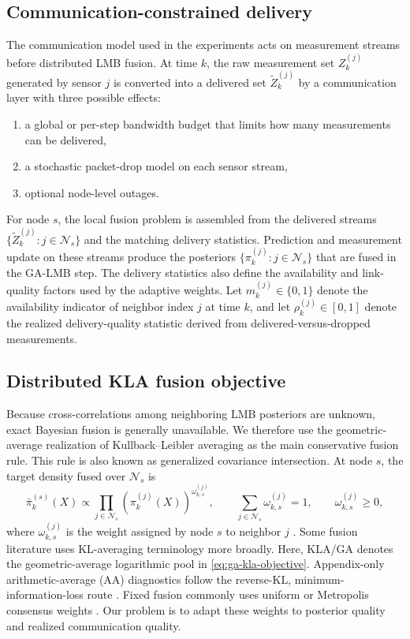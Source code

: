 \subsection{Communication-constrained delivery}

The communication model used in the experiments acts on measurement streams before distributed LMB fusion. At time $k$, the raw measurement set $Z_k^{(j)}$ generated by sensor $j$ is converted into a delivered set $\tilde{Z}_k^{(j)}$ by a communication layer with three possible effects:
\begin{enumerate}
\item a global or per-step bandwidth budget that limits how many measurements can be delivered,
\item a stochastic packet-drop model on each sensor stream,
\item optional node-level outages.
\end{enumerate}
For node $s$, the local fusion problem is assembled from the delivered streams $\{\tilde{Z}_k^{(j)}:j\in\mathcal{N}_s\}$ and the matching delivery statistics. Prediction and measurement update on these streams produce the posteriors $\{\pi_k^{(j)}:j\in\mathcal{N}_s\}$ that are fused in the GA-LMB step. The delivery statistics also define the availability and link-quality factors used by the adaptive weights. Let $m_k^{(j)} \in \{0,1\}$ denote the availability indicator of neighbor index $j$ at time $k$, and let $\rho_k^{(j)} \in [0,1]$ denote the realized delivery-quality statistic derived from delivered-versus-dropped measurements.

\subsection{Distributed KLA fusion objective}

Because cross-correlations among neighboring LMB posteriors are unknown, exact Bayesian fusion is generally unavailable. We therefore use the geometric-average realization of Kullback--Leibler averaging as the main conservative fusion rule. This rule is also known as generalized covariance intersection. At node $s$, the target density fused over $\mathcal{N}_s$ is
\begin{equation}
\label{eq:ga-kla-objective}
\bar{\pi}_k^{(s)}(X) \propto \prod_{j \in \mathcal{N}_s} \left(\pi_k^{(j)}(X)\right)^{\omega_{k,s}^{(j)}},
\qquad
\sum_{j \in \mathcal{N}_s} \omega_{k,s}^{(j)} = 1,
\qquad
\omega_{k,s}^{(j)} \ge 0,
\end{equation}
where $\omega_{k,s}^{(j)}$ is the weight assigned by node $s$ to neighbor $j$ \cite{Battistelli2014KLA,Hlinka2014ICI}. Some fusion literature uses KL-averaging terminology more broadly. Here, KLA/GA denotes the geometric-average logarithmic pool in \eqref{eq:ga-kla-objective}. Appendix-only arithmetic-average (AA) diagnostics follow the reverse-KL, minimum-information-loss route \cite{LiCorchadoSun2017GCIAlternative,Gao2020MIL,Li2024AADensityFusion}. Fixed fusion commonly uses uniform or Metropolis consensus weights \cite{XiaoBoydLall2005ConsensusWeights}. Our problem is to adapt these weights to posterior quality and realized communication quality.

